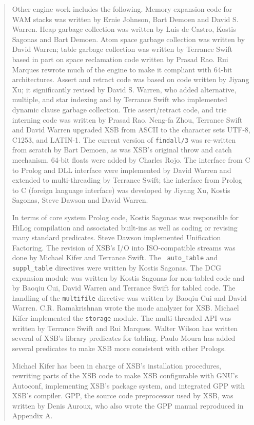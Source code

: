 \begin{quote}
Other engine work includes the following.  Memory expansion code for
WAM stacks was written by Ernie Johnson, Bart Demoen and David
S. Warren.  Heap garbage collection was written by Luis de Castro,
Kostis Sagonas and Bart Demoen.  Atom space garbage collection was
written by David Warren; table garbage collection was written by
Terrance Swift based in part on space reclamation code written by
Prasad Rao.  Rui Marques rewrote much of the engine to make it
compliant with 64-bit architectures.  Assert and retract code was
based on code written by Jiyang Xu; it significantly revised by David
S. Warren, who added alternative, multiple, and star indexing and by
Terrance Swift who implemented dynamic clause garbage collection. Trie
assert/retract code, and trie interning code was written by Prasad
Rao.  Neng-fa Zhou, Terrance Swift and David Warren upgraded XSB from
ASCII to the character sets UTF-8, C1253, and LATIN-1.  The current
version of {\tt findall/3} was re-written from scratch by Bart Demoen,
as was XSB's original throw and catch mechanism.  64-bit floats were
added by Charles Rojo.  The interface from C to Prolog and DLL
interface were implemented by David Warren and extended to
multi-threading by Terrance Swift; the interface from Prolog to C
(foreign language interface) was developed by Jiyang Xu, Kostis
Sagonas, Steve Dawson and David Warren.

In terms of core system Prolog code, Kostis Sagonas was responsible
for HiLog compilation and associated built-ins as well as coding or
revising many standard predicates.  Steve Dawson implemented
Unification Factoring.  The revision of XSB's I/O into ISO-compatible
streams was done by Michael Kifer and Terrance Swift.  The {\tt
  auto\_table} and {\tt suppl\_table} directives were written by
Kostis Sagonas.  The DCG expansion module was written by Kostis
Sagonas for non-tabled code and by Baoqiu Cui, David Warren and
Terrance Swift for tabled code.  The handling of the {\tt multifile}
directive was written by Baoqiu Cui and David
Warren. C.R. Ramakrishnan wrote the mode analyzer for XSB.  Michael
Kifer implemented the {\tt storage} module.  The multi-threaded API
was written by Terrance Swift and Rui Marques.  Walter Wilson has
written several of XSB's library predicates for tabling.  Paulo Moura
has added several predicates to make XSB more consistent with other
Prologs.  

Michael Kifer has been in charge of XSB's installation procedures,
rewriting parts of the XSB code to make XSB configurable with GNU's
Autoconf, implementing XSB's package system, and integrated GPP with
XSB's compiler.  GPP, the source code preprocessor used by XSB, was
written by Denis Auroux, who also wrote the GPP manual reproduced in
Appendix A.


\end{quote}
